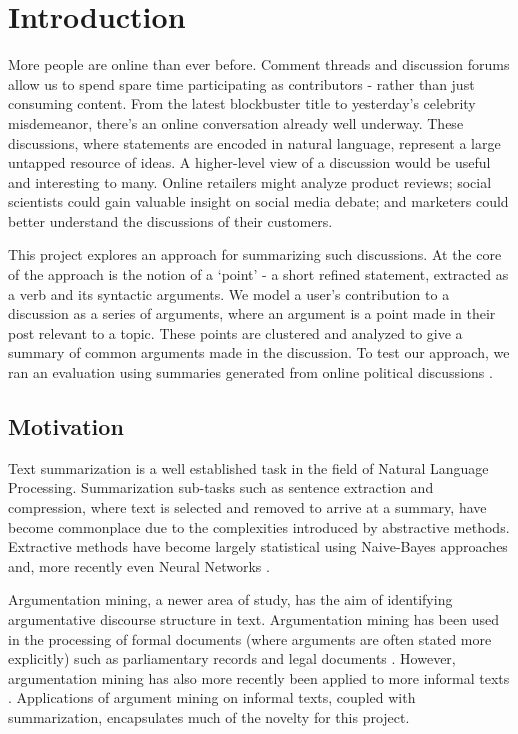 \chapter{Introduction\label{chap:introduction}}
  More people are online than ever before. Comment threads and discussion forums allow us to spend spare time participating as contributors - rather than just consuming content. From the latest blockbuster title to yesterday's celebrity misdemeanor, there's an online conversation already well underway. These discussions, where statements are encoded in natural language, represent a large untapped resource of ideas. A higher-level view of a discussion would be useful and interesting to many. Online retailers might analyze product reviews; social scientists could gain valuable insight on social media debate; and marketers could better understand the discussions of their customers.

  This project explores an approach for summarizing such discussions. At the core of the approach is the notion of a `point' - a short refined statement, extracted as a verb and its syntactic arguments. We model a user's contribution to a discussion as a series of arguments, where an argument is a point made in their post relevant to a topic. These points are clustered and analyzed to give a summary of common arguments made in the discussion. To test our approach, we ran an evaluation using summaries generated from online political discussions \cite{walker2012corpus}.

  \section{Motivation}
    Text summarization is a well established task in the field of Natural Language Processing. Summarization sub-tasks such as sentence extraction and compression, where text is selected and removed to arrive at a summary, have become commonplace due to the complexities introduced by abstractive methods. Extractive methods have become largely statistical using Naive-Bayes \cite{kupiec1995trainable} approaches and, more recently even Neural Networks \cite{svore2007enhancing}.

    Argumentation mining, a newer area of study, has the aim of identifying argumentative discourse structure in text. Argumentation mining has been used in the processing of formal documents (where arguments are often stated more explicitly) such as parliamentary records \cite{palau2009argumentation} and legal documents \cite{montemagni2010semantic}. However, argumentation mining has also more recently been applied to more informal texts \cite{park2015conditional}. Applications of argument mining on informal texts, coupled with summarization, encapsulates much of the novelty for this project.

